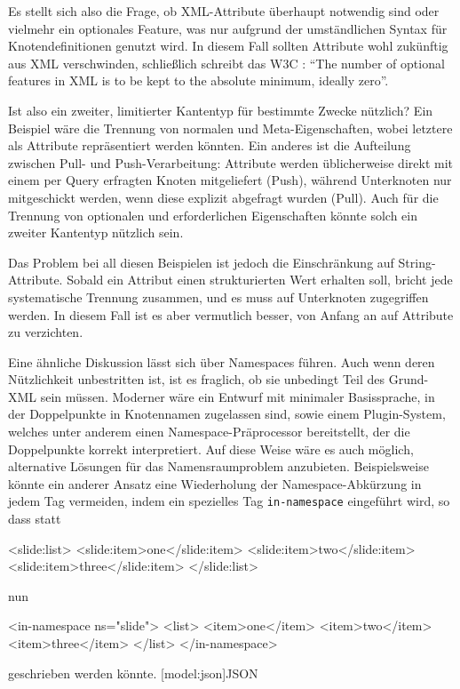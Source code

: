 \documentclass[11pt, a4paper, bibgerm]{scrbook}
\newenvironment{DIFnomarkup}{}{}
\newcommand\icode[1]{\lstinline?#1?}
\newcommand\lsection{}
\begin{document}
Es stellt sich also die Frage, ob XML-Attribute überhaupt notwendig sind
oder vielmehr ein optionales Feature, was nur aufgrund der umständlichen
Syntax für Knotendefinitionen genutzt wird. In diesem Fall
sollten Attribute wohl zukünftig aus XML verschwinden, schließlich
schreibt das W3C \cite{XmlSpec}: "`The number of optional features in XML
is to be kept to the absolute minimum, ideally zero"'.

Ist also ein zweiter, limitierter Kantentyp für bestimmte Zwecke
nützlich? Ein Beispiel wäre die Trennung von normalen und
Meta-Eigenschaften, wobei letztere als Attribute repräsentiert werden
könnten. Ein anderes ist die Aufteilung zwischen Pull- und
Push-Verarbeitung: Attribute werden üblicherweise direkt mit einem per
Query erfragten Knoten mitgeliefert (Push), während Unterknoten nur
mitgeschickt werden, wenn diese explizit abgefragt wurden (Pull). Auch
für die Trennung von optionalen und erforderlichen Eigenschaften könnte
solch ein zweiter Kantentyp nützlich sein.

Das Problem bei all diesen Beispielen ist jedoch die Einschränkung auf
String-Attribute. Sobald ein Attribut einen strukturierten Wert erhalten
soll, bricht jede systematische Trennung zusammen, und es muss auf
Unterknoten zugegriffen werden. In diesem Fall ist es aber vermutlich
besser, von Anfang an auf Attribute zu verzichten.

Eine ähnliche Diskussion lässt sich über Namespaces führen. Auch wenn
deren Nützlichkeit unbestritten ist, ist es fraglich, ob sie unbedingt
Teil des Grund-XML sein müssen. Moderner wäre ein Entwurf mit
minimaler Basissprache, in der Doppelpunkte in Knotennamen zugelassen
sind, sowie einem Plugin-System, welches unter anderem einen
Namespace-Präprocessor bereitstellt, der die Doppelpunkte korrekt
interpretiert. Auf diese Weise wäre es auch möglich, alternative
Lösungen für das Namensraumproblem anzubieten. Beispielsweise könnte ein
anderer Ansatz eine Wiederholung der Namespace-Abkürzung in jedem Tag
vermeiden, indem ein spezielles Tag \icode{in-namespace} eingeführt
wird, so dass statt
\begin{DIFnomarkup}\begin{code}
<slide:list>
  <slide:item>one</slide:item>  
  <slide:item>two</slide:item>  
  <slide:item>three</slide:item>  
</slide:list>
\end{code}\end{DIFnomarkup}
nun
\begin{DIFnomarkup}\begin{code}
<in-namespace ns="slide">
  <list>
    <item>one</item>  
    <item>two</item>  
    <item>three</item>  
  </list>  
</in-namespace>
\end{code}\end{DIFnomarkup}
geschrieben werden könnte.
\lsection[model:json]{JSON}
\end{document}
